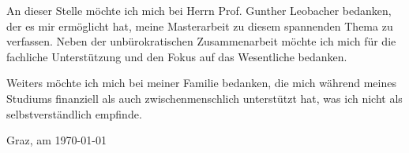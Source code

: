 An dieser Stelle m\"ochte ich mich bei Herrn Prof. Gunther Leobacher bedanken, der es mir erm\"oglicht hat, meine Masterarbeit zu
diesem spannenden Thema zu verfassen. Neben der unb\"urokratischen Zusammenarbeit m\"ochte ich mich f\"ur die fachliche
Unterst\"utzung und den Fokus auf das Wesentliche bedanken.

Weiters m\"ochte ich mich bei meiner Familie bedanken, die mich w\"ahrend meines Studiums finanziell als auch zwischenmenschlich unterst\"utzt hat, 
was ich nicht als selbstverst\"andlich empfinde.

Graz, am \today{}
